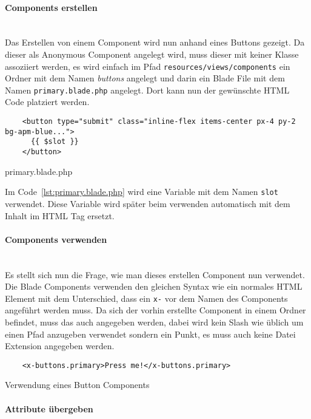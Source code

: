 \paragraph{Components erstellen}\mbox{}\\

Das Erstellen von einem Component wird nun anhand eines Buttons gezeigt. Da
dieser als Anonymous Component angelegt wird, muss dieser mit keiner Klasse
assoziiert werden, es wird einfach im Pfad \verb|resources/views/components| ein
Ordner mit dem Namen \textit{buttons} angelegt und darin ein Blade File mit dem
Namen \verb|primary.blade.php| angelegt. Dort kann nun der gewünschte HTML Code platziert
werden.

\begin{listing}[H]
  \begin{verbatim}
    <button type="submit" class="inline-flex items-center px-4 py-2 bg-apm-blue...">
      {{ $slot }}
    </button>
  \end{verbatim}
  \caption{primary.blade.php}
  \label{lst:primary.blade.php}
\end{listing}

Im Code~\ref{lst:primary.blade.php} wird eine Variable mit dem Namen \verb|slot|
verwendet. Diese Variable wird später beim verwenden automatisch mit dem
Inhalt im HTML Tag ersetzt.

\paragraph{Components verwenden}\mbox{}\\

Es stellt sich nun die Frage, wie man dieses erstellen Component nun verwendet.
Die Blade Components verwenden den gleichen Syntax wie ein normales HTML
Element mit dem Unterschied, dass ein \verb|x-| vor dem Namen des Components
angeführt werden muss. Da sich der vorhin erstellte Component in einem Ordner befindet, muss das auch
angegeben werden, dabei wird kein Slash wie üblich um einen Pfad anzugeben
verwendet sondern ein Punkt, es muss auch keine Datei Extension angegeben werden.

\begin{listing}[H]
  \begin{verbatim}
    <x-buttons.primary>Press me!</x-buttons.primary>
  \end{verbatim}
  \caption{Verwendung eines Button Components}
\end{listing}

\paragraph{Attribute übergeben}\mbox{}\\

